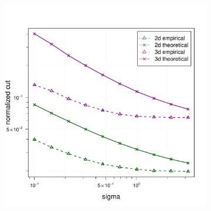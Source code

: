 \documentclass{article}
\newcommand{\1}{\mathbf{1}}
\theoremstyle{aldenthm}
\theoremstyle{aldenrmrk}
\begin{document}
\begin{figure}
\begin{adjustbox}{minipage=\linewidth,scale=0.8}
\begin{subfigure}{.33\linewidth}
		\caption{}
	\end{subfigure}
	\begin{subfigure}{.33\linewidth}
		\includegraphics[width=\linewidth]{example1plots/sigma_normalized_cut_plot}
		\caption{}
	\end{subfigure}


\end{adjustbox}
\end{figure}
\end{document}
